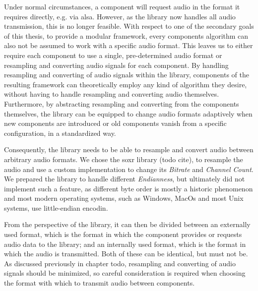 Under normal circumstances, a component will request audio in the format it requires directly, e.g. via \gls{alsa}.
However, as the library now handles all audio transmission, this is no longer feasible.
With respect to one of the secondary goals of this thesis, to provide a modular framework, every components algorithm can also not be assumed to work with a specific audio format.
This leaves us to either require each component to use a single, pre-determined audio format or resampling and converting audio signals for each component.
By handling resampling and converting of audio signals within the library, components of the resulting framework can theoretically employ any kind of algorithm they desire, without having to handle resampling and converting audio themselves.
Furthermore, by abstracting resampling and converting from the components themselves, the library can be equipped to change audio formats adaptively when new components are introduced or old components vanish from a specific configuration, in a standardized way.

Consequently, the library needs to be able to resample and convert audio between arbitrary audio formats.
We chose the \gls{soxr} library (todo cite), to resample the audio and use a custom implementation to change its \textit{Bitrate} and \textit{Channel Count}.
We prepared the library to handle different \textit{Endianness}, but ultimately did not implement such a feature, as different byte order is mostly a historic phenomenon and most modern operating systems, such as Windows, MacOs and most Unix systems, use little-endian encodin.

From the perspective of the library, it can then be divided between an externally used format, which is the format in which the component provides or requests audio data to the library; and an internally used format, which is the format in which the audio is transmitted.
Both of these can be identical, but must not be.
As discussed previously in chapter todo, resampling and converting of audio signals should be minimized, so careful consideration is required when choosing the format with which to transmit audio between components.

